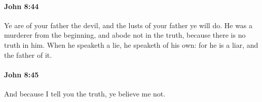 		\paragraph{John 8:44} %
			\label{JOHN-8-44}

			Ye are of your father the devil, and the lusts of your father ye will do. He was a murderer from the beginning, and abode not in the truth, because there is no truth in him. When he speaketh a lie, he speaketh of his own: for he is a liar, and the father of it.

			\begin{framed}
				\scriptsize
				\begin{compactdesc}
					\item[SBLG] 
				\end{compactdesc}
			\end{framed}

		\paragraph{John 8:45} %
			\label{JOHN-8-45}

			And because I tell you the truth, ye believe me not.

